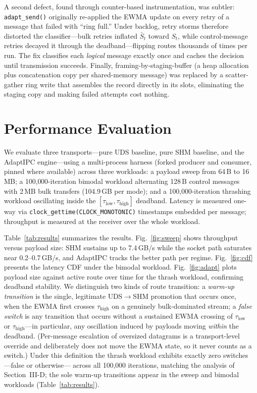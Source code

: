 \documentclass[conference]{IEEEtran}
\newcommand{\taulow}{\tau_{\mathrm{low}}}
\newcommand{\tauhigh}{\tau_{\mathrm{high}}}
\newcommand{\sbar}{\bar{S}}
\begin{document}
A second defect, found through counter-based instrumentation, was subtler:
\texttt{adapt\_send()} originally re-applied the EWMA update on every
retry of a message that failed with ``ring full.'' Under backlog, retry
storms therefore distorted the classifier---bulk retries inflated
$\sbar_t$ toward $S_t$, while control-message retries decayed it through
the deadband---flipping routes thousands of times per run. The fix classifies
each \emph{logical} message exactly once and caches the decision until
transmission succeeds. Finally, framing-by-staging-buffer (a heap allocation
plus concatenation copy per shared-memory message) was replaced by a
scatter-gather ring write that assembles the record directly in its slots,
eliminating the staging copy and making failed attempts cost nothing.

\section{Performance Evaluation}
We evaluate three transports---pure UDS baseline, pure SHM baseline, and the
AdaptIPC engine---using a multi-process harness (forked producer and consumer,
pinned where available) across three workloads: a payload sweep from 64\,B to
16\,MB; a 100{,}000-iteration bimodal workload alternating 128\,B control
messages with 2\,MB bulk transfers (104.9\,GB per mode); and a 100{,}000-iteration
thrashing workload oscillating inside the $[\taulow, \tauhigh]$ deadband.
Latency is measured one-way via \texttt{clock\_gettime(CLOCK\_MONOTONIC)}
timestamps embedded per message; throughput is measured at the receiver over
the whole workload.

Table~\ref{tab:results} summarizes the results. Fig.~\ref{fig:sweep} shows
throughput versus payload size: SHM sustains up to 7.4\,GB/s while the socket
path saturates near 0.2--0.7\,GB/s, and AdaptIPC tracks the better path per
regime. Fig.~\ref{fig:cdf} presents the latency CDF under the bimodal
workload. Fig.~\ref{fig:adapt} plots payload size against active route over
time for the thrash workload, confirming deadband stability. We distinguish
two kinds of route transition: a \emph{warm-up transition} is the single,
legitimate UDS$\rightarrow$SHM promotion that occurs once, when the EWMA
first crosses $\tauhigh$ on a genuinely bulk-dominated stream; a
\emph{false switch} is any transition that occurs without a sustained EWMA
crossing of $\taulow$ or $\tauhigh$---in particular, any oscillation induced
by payloads moving \emph{within} the deadband. (Per-message escalation of
oversized datagrams is a transport-level override and deliberately does not
move the EWMA state, so it never counts as a switch.) Under this definition
the thrash workload exhibits exactly zero switches---false or otherwise---
across all 100{,}000 iterations, matching the analysis of Section~III-D;
the sole warm-up transitions appear in the sweep and bimodal workloads
(Table~\ref{tab:results}).
\end{document}
